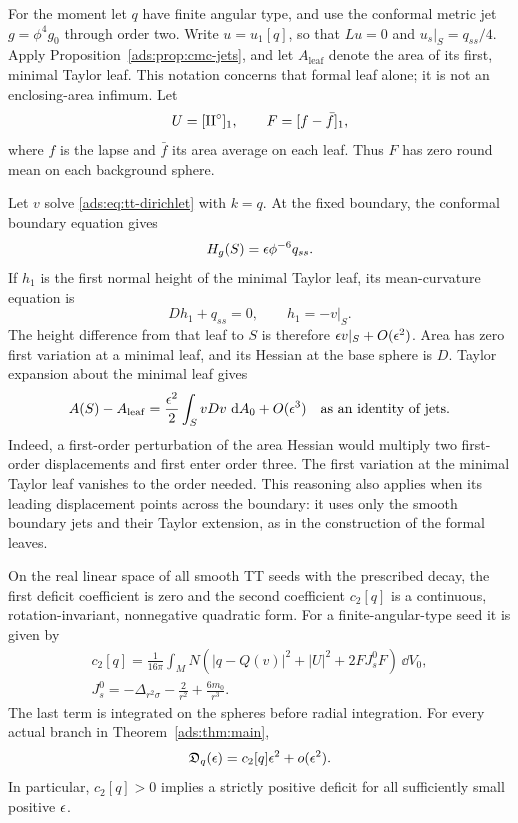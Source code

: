For the moment let $q$ have finite angular type, and use the conformal
metric jet $g=\phi^4g_0$ through order two.  Write $u=u_1[q]$, so that
$Lu=0$ and $u_s|_S=q_{ss}/4$.  Apply
Proposition~\ref{ads:prop:cmc-jets}, and let $A_{\mathrm{leaf}}$ denote the
area of its first, minimal Taylor leaf.  This notation concerns that
formal leaf alone; it is not an enclosing-area infimum.  Let
\[
 U=[\mathrm{II}^{\circ}]_1,
 \qquad F=[f-\bar f]_1,
\]
where $f$ is the lapse and $\bar f$ its area average on each leaf.
Thus $F$ has zero round mean on each background sphere.

Let $v$ solve \eqref{ads:eq:tt-dirichlet} with $k=q$.  At the fixed boundary,
the conformal boundary equation gives
\[
 H_g(S)=\epsilon\phi^{-6}q_{ss}.
\]
If $h_1$ is the first normal height of the minimal Taylor leaf, its
mean-curvature equation is
\[
 Dh_1+q_{ss}=0,
 \qquad h_1=-v|_S.
\]
The height difference from that leaf to $S$ is therefore
$\epsilon v|_S+O(\epsilon^2)$.  Area has zero first variation at a minimal
leaf, and its Hessian at the base sphere is $D$.  Taylor expansion about
the minimal leaf gives
\begin{equation}
 A(S)-A_{\mathrm{leaf}}
 =\frac{\epsilon^2}{2}\int_SvDv\,\,\mathrm d A_0+O(\epsilon^3)
 \quad\text{as an identity of jets}.
 \label{ads:eq:quadratic-area-gap}
\end{equation}
Indeed, a first-order perturbation of the area Hessian would multiply
two first-order displacements and first enter order three.  The first
variation at the minimal Taylor leaf vanishes to the order needed.
This reasoning also applies when its leading displacement points across
the boundary: it uses only the smooth boundary jets and their Taylor
extension, as in the construction of the formal leaves.

\begin{proposition}
\label{ads:prop:quadratic}
On the real linear space of all smooth TT seeds with the prescribed
decay, the first deficit coefficient is zero and the second coefficient
$c_2[q]$ is a continuous, rotation-invariant, nonnegative quadratic form.
For a finite-angular-type seed it is given by
\begin{equation}
 \begin{gathered}
 c_2[q]=\frac1{16\pi}\int_M N\left(
 |q-Q(v)|^2+|U|^2+2FJ_s^0F\right)\,\dd V_0,\\
 J_s^0=-\Delta_{r^2\sigma}-\frac2{r^2}+\frac{6m_0}{r^3}.
 \end{gathered}
 \label{ads:eq:quadratic-positive-form}
\end{equation}
The last term is integrated on the spheres before radial integration.
For every actual branch in Theorem~\ref{ads:thm:main},
\begin{equation}
 \mathfrak D_q(\epsilon)=c_2[q]\epsilon^2+o(\epsilon^2).
 \label{ads:eq:actual-quadratic-deficit}
\end{equation}
In particular, $c_2[q]>0$ implies a strictly positive deficit for all
sufficiently small positive $\epsilon$.
\end{proposition}

